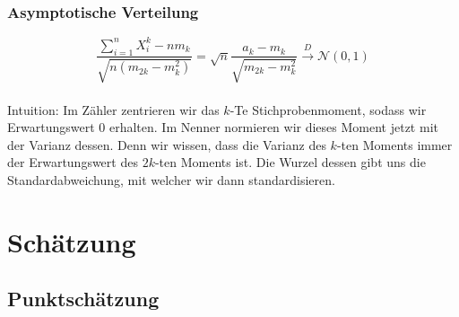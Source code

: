 \documentclass[a4paper]{article}
\begin{document}
\subsubsection{Asymptotische Verteilung}

\begin{theorem}
	\[
	\frac{ \sum_{i=1}^{n} X_i ^{k} - nm_k }{ \sqrt{n \left(
		m_{2k} - m_k ^2
	\right) } } = \sqrt{n} \frac{ a_k - m_k }{ 
		\sqrt{m_{2k} - m_k ^2} 
	} \overset{D} \longrightarrow \mathcal{N} (0, 1)
	\]
	\\
	Intuition: Im Zähler zentrieren wir das $k$-Te Stichprobenmoment, sodass wir
	Erwartungswert 0 erhalten. Im Nenner normieren wir dieses Moment jetzt mit
	der Varianz dessen. Denn wir wissen, dass die Varianz des $k$-ten Moments
	immer der Erwartungswert des $2k$-ten Moments ist. Die Wurzel dessen gibt
	uns die Standardabweichung, mit welcher wir dann standardisieren.
\end{theorem}

\section{Schätzung}

\subsection{Punktschätzung}
\end{document}
